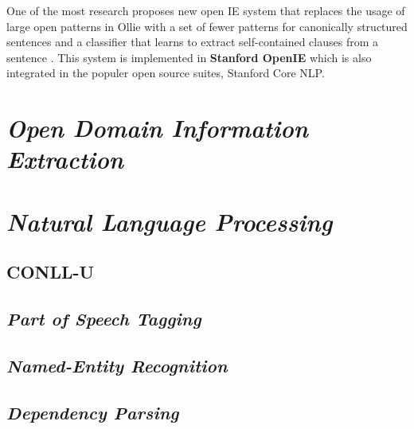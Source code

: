 One of the most research proposes new open IE system that replaces the usage of large open patterns in Ollie \citep{schmitz2012open} with a set of fewer patterns for canonically structured sentences and a classifier that learns to extract self-contained clauses from a sentence \citep{angeli2015leveraging}. This system is implemented in \textbf{Stanford OpenIE} which is also integrated in the populer open source suites, Stanford Core NLP.

\section{\textit{Open Domain Information Extraction}}

\lipsum[2-3]

\section{\textit{Natural Language Processing}}

\lipsum[3]

\subsection{CONLL-U}

\lipsum[4]

\subsection{\textit{Part of Speech Tagging}}

\lipsum[4]

\subsection{\textit{Named-Entity Recognition}}

\lipsum[5]

\subsection{\textit{Dependency Parsing}}

\lipsum[6]

